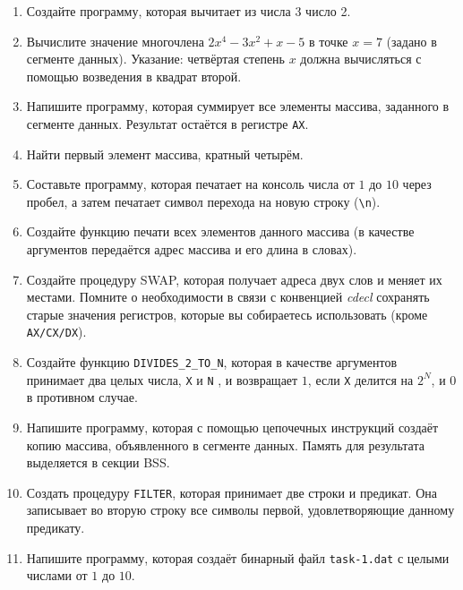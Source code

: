 
\begin{enumerate}
	\item Создайте программу, которая вычитает из числа 3 число 2.

	\item Вычислите значение многочлена $2x^4-3x^2+x-5$
	в точке $x = 7$ (задано в сегменте данных). 
	Указание: четвёртая степень $x$ должна вычисляться с помощью возведения в квадрат второй.

	\item Напишите программу, которая суммирует все элементы массива, заданного в сегменте данных. Результат остаётся в регистре \texttt{AX}.

	\item Найти первый элемент массива, кратный четырём.

	\item Составьте программу, которая печатает на консоль числа от $1$ до $10$ через пробел, а затем печатает символ перехода на новую строку (\texttt{\textbackslash{}n}).

	\item Создайте функцию печати всех элементов данного массива (в качестве аргументов передаётся адрес массива и его длина в словах).

	\item Создайте процедуру SWAP, которая получает адреса
	двух слов и меняет их местами. Помните о необходимости в связи с конвенцией \textit{cdecl} сохранять старые значения регистров, которые вы собираетесь использовать (кроме
	\texttt{AX/CX/DX}).

	\item Создайте функцию \texttt{DIVIDES\_2\_TO\_N}, которая
	в качестве аргументов принимает два целых числа, \texttt{X} и \texttt{N} , и возвращает $1$,
	если \texttt{X} делится на $2^N$, и $0$ в противном случае.

	\item Напишите программу, которая с помощью цепочечных инструкций создаёт копию массива,
	объявленного в сегменте данных. Память для результата выделяется в
	секции BSS.

	\item Создать процедуру \texttt{FILTER}, которая принимает две строки и
	предикат. Она записывает во вторую строку все символы первой, удовлетворяющие данному предикату.

	\item Напишите программу, которая создаёт бинарный файл \texttt{task-1.dat} с целыми числами от $1$ до $10$.


\end{enumerate}
